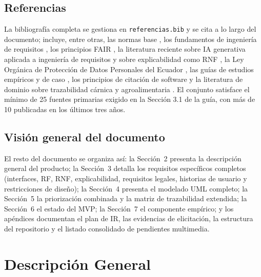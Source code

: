 \documentclass[11pt,a4paper]{article}
\begin{document}
\subsection{Referencias}
La bibliografía completa se gestiona en \texttt{referencias.bib} y se cita a lo largo del documento; incluye, entre otras, las normas base \cite{iso29148,iso25010}, los fundamentos de ingeniería de requisitos \cite{pohl2010,swebok2024}, los principios FAIR \cite{wilkinson2016fair}, la literatura reciente sobre IA generativa aplicada a ingeniería de requisitos \cite{cheng2026genai,arora2024genai,vogelsang2024llm} y sobre explicabilidad como RNF \cite{chazette2020explainability,chazette2021exploring,chazette2022explainable}, la Ley Orgánica de Protección de Datos Personales del Ecuador \cite{lopd2021}, las guías de estudios empíricos y de caso \cite{molleri2020checklist,hennink2017saturation,hagaman2017interviews,guest2006interviews,runeson2009casestudy,mendez2017naming,jedlitschka2008reporting,wohlin2012experimentation,nosek2018preregistration,montgomery2022requirementsquality,cohen1960kappa,fleiss1971kappa,ferrari2016ambiguity,fischbach2023acceptance,kitchenham2007slr}, los principios de citación de software \cite{smith2016softwarecitation,druskat2021cff} y la literatura de dominio sobre trazabilidad cárnica y agroalimentaria \cite{chen2021blockchain,beck2021blockchainmeat,varavallo2022greenblockchain,escalona2022traceability,demi2021blockchaintraceability}. El conjunto satisface el mínimo de 25 fuentes primarias exigido en la Sección 3.1 de la guía, con más de 10 publicadas en los últimos tres años.

\subsection{Visión general del documento}
El resto del documento se organiza así: la Sección~2 presenta la descripción general del producto; la Sección~3 detalla los requisitos específicos completos (interfaces, RF, RNF, explicabilidad, requisitos legales, historias de usuario y restricciones de diseño); la Sección~4 presenta el modelado UML completo; la Sección~5 la priorización combinada y la matriz de trazabilidad extendida; la Sección~6 el estado del MVP; la Sección~7 el componente empírico; y los apéndices documentan el plan de IR, las evidencias de elicitación, la estructura del repositorio y el listado consolidado de pendientes multimedia.

\section{Descripción General}
\end{document}
